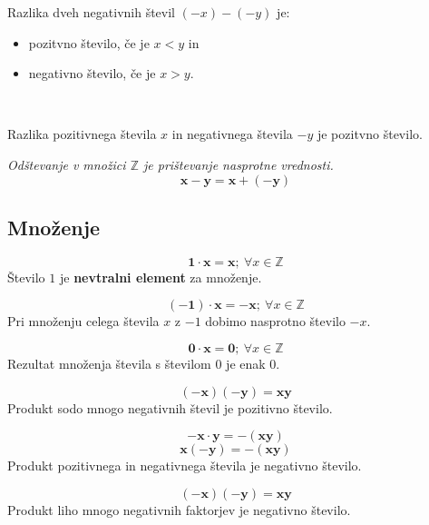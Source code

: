              
                Razlika dveh negativnih števil $(-x)-(-y)$ je:
                \begin{itemize}
                    \item pozitvno število, če je $x<y$ in 
                    \item negativno število, če je $x>y$.
                \end{itemize}
               ~

             
                Razlika pozitivnega števila $x$ in negativnega števila $-y$ je pozitvno število.
                ~\newline


            
                \textit{Odštevanje v množici $\mathbb{Z}$ je prištevanje nasprotne vrednosti.}
                $$\mathbf{x-y=x+(-y)} $$
            
         

         
            \subsection{Množenje}

             
                $$\mathbf{1\cdot x=x}; ~\forall x\in\mathbb{Z}$$
                Število $1$ je \textbf{nevtralni element} za množenje.
             

             
                $$\mathbf{(-1)\cdot x=-x}; ~\forall x\in\mathbb{Z}$$
                Pri množenju celega števila $x$ z $-1$ dobimo nasprotno število $-x$.
             

             
                $$\mathbf{0\cdot x=0}; ~\forall x\in\mathbb{Z}$$
                Rezultat množenja števila s številom $0$ je enak $0$.
             

         

         


             
                $$\mathbf{(-x)(-y)=xy}$$
                Produkt sodo mnogo negativnih števil je pozitivno število.
             

             
                $$\mathbf{-x\cdot y=-(xy)}$$
                $$\mathbf{x(-y)=-(xy)}$$
                Produkt pozitivnega in negativnega števila je negativno število.
             

             
                $$\mathbf{(-x)(-y)=xy}$$
                Produkt liho mnogo negativnih faktorjev je negativno število.
                ~\newline

